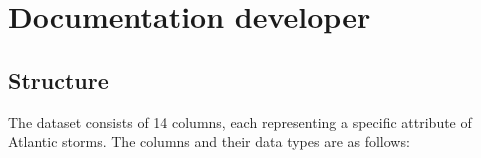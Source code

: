 %
%
%
%
%
%

\chapter{Documentation developer}

\section{Structure}
The dataset consists of 14 columns, each representing a specific attribute of Atlantic storms. The columns and their data types are as follows:

